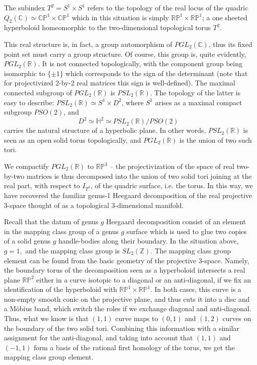 \documentclass[pdflatex,sn-mathphys-num]{sn-jnl}%
\theoremstyle{thmstyleone}%
\theoremstyle{thmstyletwo}%
\theoremstyle{thmstylethree}%
\newcommand{\R}{\mathbb{R}}
\newcommand{\C}{\mathbb{C}}
\newcommand{\p}{{\mathbb{P}}}
\begin{document}
The subindex $T^2=S^1\times S^1$ refers to the topology of the real locus of the quadric $Q_2(\C)\simeq \C\p^1\times \C\p^1$ which in this situation is simply $\R\p^1\times \R\p^1$; a one sheeted hyperboloid homeomorphic to the two-dimensional topological torus $T^2$.

This real structure is, in fact, a group automorphism of $PGL_2(\C)$, thus its fixed
point set must carry a group structure. Of course, this group is, quite evidently, $PGL_2(\R).$
It is not connected topologically, with the component group being isomorphic to $\{\pm 1\}$ which corresponds to the sign of the determinant (note that for projectivized 2-by-2 real matrices this sign is well-defined). The maximal connected subgroup of $PGL_2(\R)$  is $PSL_2(\R).$ The topology of the latter is easy to describe: $PSL_2(\R)\simeq S^1\times D^2$,  where $S^1$ arises as a maximal compact subgroup $PSO(2)$, and $$D^2\simeq \mathbb{H}^2 \simeq {PSL_2(\R)}\slash{PSO(2)}$$ carries the natural structure of a hyperbolic
plane. In other words, $PSL_2(\R)$ is seen as an open solid torus topologically, and $PGL_2(\R)$ is the union of two such tori.

We compactify $PGL_2(\R)$ to $\R\p^3$ -- the projectivization of the space of real two-by-two matrices is thus decomposed into the union of two solid
tori joining at the real part, with respect to $I_{T^2}$, of the quadric surface, i.e. the torus. In this way, we have recovered the familiar genus-1 Heegaard  decomposition of the real projective 3-space thought of as a topological 3-dimensional manifold. 

Recall that the datum of genus $g$ Heegaard decomposition consist of an element in the mapping class group of a genus $g$ surface which is used to glue two copies of a solid genus $g$ handle-bodies along their boundary. In the situation above, $g=1,$ and the mapping class group is $SL_2(\mathbb{Z}).$ The mapping class group element can be found from the basic geometry of the projective $3$-space. Namely, the boundary torus of the decomposition seen as a hyperboloid intersects a real plane $\mathbb{R}\p^2$ either in a curve isotopic to a diagonal or an anti-diagonal, if we fix an identification of the hyperboloid with $\mathbb{R}\p^1\times\mathbb{R}\p^1.$ In both cases, this curve is a non-empty smooth conic on the projective plane, and thus cuts it into a disc and a M\"obius band, which switch the roles if we exchange diagonal and anti-diagonal. Thus, what we know is that $(1,1)$ curve maps to $(0,1)$ and $(1,2)$ curves on the boundary of the two solid tori. Combining this information with a similar assignment for the anti-diagonal, and taking into account that $(1,1)$ and $(-1,1)$ form a basis of the rational first homology of the torus, we get the mapping class group element.
\end{document}
